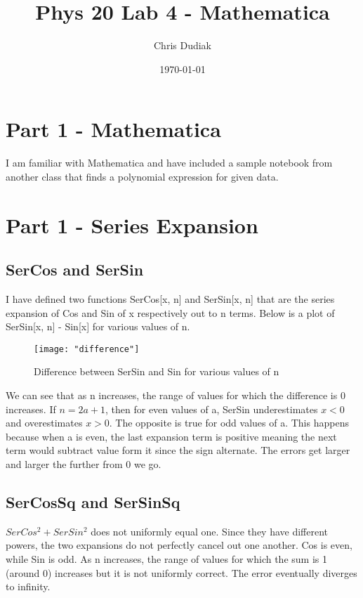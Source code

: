 \documentclass{article}
\begin{document}
\title{Phys 20 Lab 4 - Mathematica}
\author{Chris Dudiak}
\date{\today}
\maketitle

\section{Part 1 - Mathematica}

I am familiar with Mathematica and have included a sample notebook from another class that finds a polynomial expression for given data.

\section{Part 1 - Series Expansion}

\subsection{SerCos and SerSin}

I have defined two functions SerCos[x, n] and SerSin[x, n] that are the series expansion of Cos and Sin of x respectively out to n terms.
Below is a plot of SerSin[x, n] - Sin[x] for various values of n.

\begin{figure}[h!]
	\centering
	\texttt{[image: "difference"]}
	\caption{Difference between SerSin and Sin for various values of n}
\end{figure} 
\FloatBarrier

We can see that as n increases, the range of values for which the difference is 0 increases. If $n = 2a + 1$, then for even values of a, 
SerSin underestimates $x < 0$ and overestimates $x > 0$. The opposite is true for odd values of a. This happens because when a is even,
the last expansion term is positive meaning the next term would subtract value form it since the sign alternate. The errors get larger and 
larger the further from 0 we go.

\subsection{SerCosSq and SerSinSq}

$SerCos^2 + SerSin^2$ does not uniformly equal one. Since they have different powers, the two expansions do not perfectly cancel
out one another. Cos is even, while Sin is odd. As n increases, the range of values for which the sum is 1 (around 0) increases 
but it is not uniformly correct. The error eventually diverges to infinity. 
\end{document}
